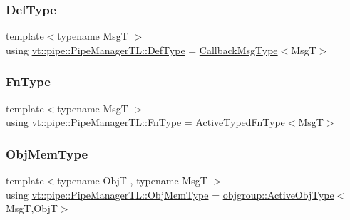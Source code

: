 \mbox{\label{structvt_1_1pipe_1_1_pipe_manager_t_l_a5f78dde989930cf645a8bd67301740a7}} 
\subsubsection{\texorpdfstring{Def\+Type}{DefType}}
{\footnotesize\ttfamily template$<$typename MsgT $>$ \\
using \hyperlink{structvt_1_1pipe_1_1_pipe_manager_t_l_a5f78dde989930cf645a8bd67301740a7}{vt\+::pipe\+::\+Pipe\+Manager\+T\+L\+::\+Def\+Type} =  \hyperlink{structvt_1_1pipe_1_1_pipe_manager_t_l_af6fc2c17f1729fa06450441b0ee81cb1}{Callback\+Msg\+Type}$<$MsgT$>$}

\mbox{\label{structvt_1_1pipe_1_1_pipe_manager_t_l_ac2c474a68a93bbc8e1d86eb99dabf1dc}} 
\subsubsection{\texorpdfstring{Fn\+Type}{FnType}}
{\footnotesize\ttfamily template$<$typename MsgT $>$ \\
using \hyperlink{structvt_1_1pipe_1_1_pipe_manager_t_l_ac2c474a68a93bbc8e1d86eb99dabf1dc}{vt\+::pipe\+::\+Pipe\+Manager\+T\+L\+::\+Fn\+Type} =  \hyperlink{namespacevt_a54eefd5373739c7365058b0d22fea6e2}{Active\+Typed\+Fn\+Type}$<$MsgT$>$}

\mbox{\label{structvt_1_1pipe_1_1_pipe_manager_t_l_a1a8a2e05fd84f8ac7b7dda4b64e5abe5}} 
\subsubsection{\texorpdfstring{Obj\+Mem\+Type}{ObjMemType}}
{\footnotesize\ttfamily template$<$typename ObjT , typename MsgT $>$ \\
using \hyperlink{structvt_1_1pipe_1_1_pipe_manager_t_l_a1a8a2e05fd84f8ac7b7dda4b64e5abe5}{vt\+::pipe\+::\+Pipe\+Manager\+T\+L\+::\+Obj\+Mem\+Type} =  \hyperlink{namespacevt_1_1objgroup_a979bd9dc714fdacafc4b83f98271bc23}{objgroup\+::\+Active\+Obj\+Type}$<$MsgT,ObjT$>$}

